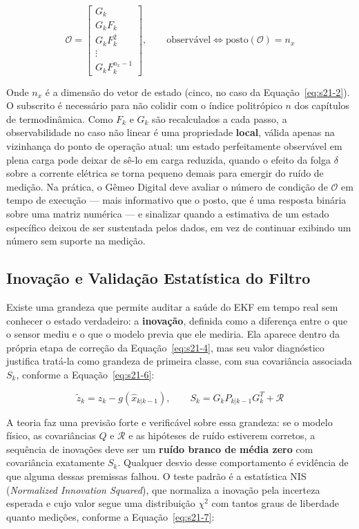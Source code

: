 \documentclass[12pt,a4paper]{article}
\numberwithin{equation}{section}
\numberwithin{table}{section}
\numberwithin{figure}{section}
\begin{document}
{	\begin{equation}\label{eq:s21-5}
	\mathcal{O} = \begin{bmatrix} G_k \\ G_k F_k \\ G_k F_k^2 \\ \vdots \\ G_k F_k^{n_x-1} \end{bmatrix}, \qquad \text{observável} \iff \text{posto}(\mathcal{O}) = n_x
\end{equation}

	Onde $n_x$ é a dimensão do vetor de estado (cinco, no caso da Equação~\eqref{eq:s21-2}). O subscrito é necessário para não colidir com o índice politrópico $n$ dos capítulos de termodinâmica. Como $F_k$ e $G_k$ são recalculados a cada passo, a observabilidade no caso não linear é uma propriedade \textbf{local}, válida apenas na vizinhança do ponto de operação atual: um estado perfeitamente observável em plena carga pode deixar de sê-lo em carga reduzida, quando o efeito da folga $\delta$ sobre a corrente elétrica se torna pequeno demais para emergir do ruído de medição. Na prática, o Gêmeo Digital deve avaliar o número de condição de $\mathcal{O}$ em tempo de execução — mais informativo que o posto, que é uma resposta binária sobre uma matriz numérica — e sinalizar quando a estimativa de um estado específico deixou de ser sustentada pelos dados, em vez de continuar exibindo um número sem suporte na medição.

	\subsection{Inovação e Validação Estatística do Filtro}

	Existe uma grandeza que permite auditar a saúde do EKF em tempo real sem conhecer o estado verdadeiro: a \textbf{inovação}, definida como a diferença entre o que o sensor mediu e o que o modelo previa que ele mediria. Ela aparece dentro da própria etapa de correção da Equação~\eqref{eq:s21-4}, mas seu valor diagnóstico justifica tratá-la como grandeza de primeira classe, com sua covariância associada $S_k$, conforme a Equação~\eqref{eq:s21-6}:

	\begin{equation}\label{eq:s21-6}
	\tilde{z}_k = z_k - g(\hat{x}_{k|k-1}), \qquad S_k = G_k P_{k|k-1} G_k^T + \mathcal{R}
\end{equation}

	A teoria faz uma previsão forte e verificável sobre essa grandeza: se o modelo físico, as covariâncias $Q$ e $\mathcal{R}$ e as hipóteses de ruído estiverem corretos, a sequência de inovações deve ser um \textbf{ruído branco de média zero} com covariância exatamente $S_k$. Qualquer desvio desse comportamento é evidência de que alguma dessas premissas falhou. O teste padrão é a estatística NIS (\textit{Normalized Innovation Squared}), que normaliza a inovação pela incerteza esperada e cujo valor segue uma distribuição $\chi^2$ com tantos graus de liberdade quanto medições, conforme a Equação~\eqref{eq:s21-7}:

}
\end{document}
